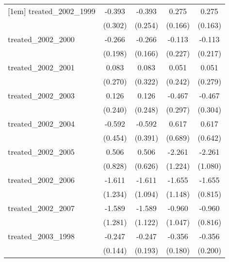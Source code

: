 {\begin{tabular}{l*{4}{c}}
[1em]
treated\_2002\_1999&      -0.393         &      -0.393         &       0.275         &       0.275         \\
            &     (0.302)         &     (0.254)         &     (0.166)         &     (0.163)         \\
[1em]
treated\_2002\_2000&      -0.266         &      -0.266         &      -0.113         &      -0.113         \\
            &     (0.198)         &     (0.166)         &     (0.227)         &     (0.217)         \\
[1em]
treated\_2002\_2001&       0.083         &       0.083         &       0.051         &       0.051         \\
            &     (0.270)         &     (0.322)         &     (0.242)         &     (0.279)         \\
[1em]
treated\_2002\_2003&       0.126         &       0.126         &      -0.467         &      -0.467         \\
            &     (0.240)         &     (0.248)         &     (0.297)         &     (0.304)         \\
[1em]
treated\_2002\_2004&      -0.592         &      -0.592         &       0.617         &       0.617         \\
            &     (0.454)         &     (0.391)         &     (0.689)         &     (0.642)         \\
[1em]
treated\_2002\_2005&       0.506         &       0.506         &      -2.261         &      -2.261\sym{*}  \\
            &     (0.828)         &     (0.626)         &     (1.224)         &     (1.080)         \\
[1em]
treated\_2002\_2006&      -1.611         &      -1.611         &      -1.655         &      -1.655\sym{*}  \\
            &     (1.234)         &     (1.094)         &     (1.148)         &     (0.815)         \\
[1em]
treated\_2002\_2007&      -1.589         &      -1.589         &      -0.960         &      -0.960         \\
            &     (1.281)         &     (1.122)         &     (1.047)         &     (0.816)         \\
[1em]
treated\_2003\_1998&      -0.247         &      -0.247         &      -0.356\sym{*}  &      -0.356         \\
            &     (0.144)         &     (0.193)         &     (0.180)         &     (0.200)         \\

\end{tabular}}
